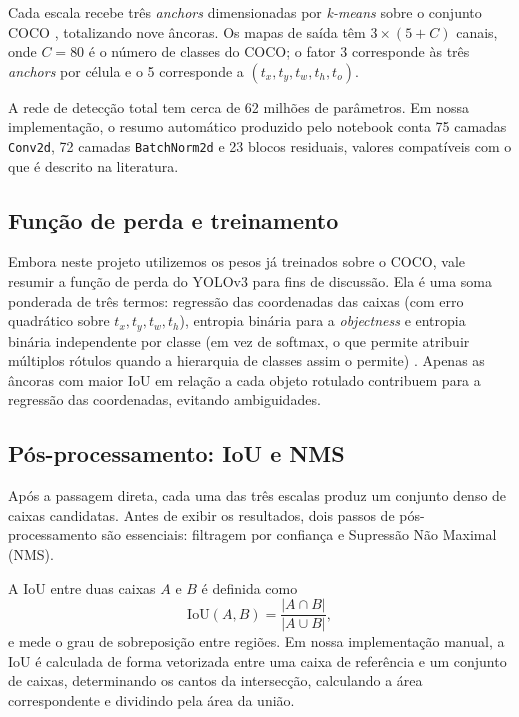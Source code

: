 \documentclass[11pt,a4paper]{article}
\begin{document}
Cada escala recebe três \emph{anchors} dimensionadas por \emph{k-means} sobre o conjunto COCO \cite{lin2014coco}, totalizando nove âncoras. Os mapas de saída têm $3 \times (5 + C)$ canais, onde $C = 80$ é o número de classes do COCO; o fator 3 corresponde às três \emph{anchors} por célula e o 5 corresponde a $(t_x, t_y, t_w, t_h, t_o)$.

A rede de detecção total tem cerca de 62 milhões de parâmetros. Em nossa implementação, o resumo automático produzido pelo notebook conta 75 camadas \texttt{Conv2d}, 72 camadas \texttt{BatchNorm2d} e 23 blocos residuais, valores compatíveis com o que é descrito na literatura.

\subsection{Função de perda e treinamento}

Embora neste projeto utilizemos os pesos já treinados sobre o COCO, vale resumir a função de perda do YOLOv3 para fins de discussão. Ela é uma soma ponderada de três termos: regressão das coordenadas das caixas (com erro quadrático sobre $t_x, t_y, t_w, t_h$), entropia binária para a \emph{objectness} e entropia binária independente por classe (em vez de softmax, o que permite atribuir múltiplos rótulos quando a hierarquia de classes assim o permite) \cite{redmon2018yolov3}. Apenas as âncoras com maior IoU em relação a cada objeto rotulado contribuem para a regressão das coordenadas, evitando ambiguidades.

\subsection{Pós-processamento: IoU e NMS}

Após a passagem direta, cada uma das três escalas produz um conjunto denso de caixas candidatas. Antes de exibir os resultados, dois passos de pós-processamento são essenciais: filtragem por confiança e Supressão Não Maximal (NMS).

A IoU entre duas caixas $A$ e $B$ é definida como
\begin{equation}
\mathrm{IoU}(A,B) = \frac{|A \cap B|}{|A \cup B|},
\end{equation}
e mede o grau de sobreposição entre regiões. Em nossa implementação manual, a IoU é calculada de forma vetorizada entre uma caixa de referência e um conjunto de caixas, determinando os cantos da intersecção, calculando a área correspondente e dividindo pela área da união.
\end{document}
